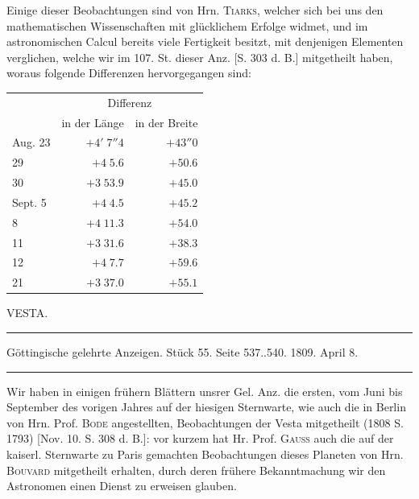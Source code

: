 \par\indent Einige dieser Beobachtungen sind von Hrn. \textsc{Tiarks}, welcher sich bei uns den mathematischen Wissenschaften mit glücklichem Erfolge widmet, und im astronomischen Calcul bereits viele Fertigkeit besitzt, mit denjenigen Elementen verglichen, welche wir im 107. St. dieser Anz. [S. 303 d. B.] mitgetheilt haben, woraus folgende Differenzen hervorgegangen sind:


\begin{center}\fontsize{10}{12}\selectfont\setlength{\tabcolsep}{5pt}\renewcommand{\arraystretch}{1.15}\begin{tabular}{lrr}
 & \multicolumn{2}{c}{Differenz}\\
 & in der Länge & in der Breite\\\hline
Aug. 23 & $+4'\;7''4$ & $+43''0$\\
29 & $+4\;5.6$ & $+50.6$\\
30 & $+3\;53.9$ & $+45.0$\\
Sept. 5 & $+4\;4.5$ & $+45.2$\\
8 & $+4\;11.3$ & $+54.0$\\
11 & $+3\;31.6$ & $+38.3$\\
12 & $+4\;7.7$ & $+59.6$\\
21 & $+3\;37.0$ & $+55.1$\\
\end{tabular}\end{center}


\begin{center}
VESTA.

\par\vspace{4pt}\hrule\vspace{4pt}

\fontsize{9}{11}\selectfont Göttingische gelehrte Anzeigen. Stück 55. Seite 537..540. 1809. April 8.

\par\vspace{4pt}\hrule\vspace{4pt}
\end{center}

Wir haben in einigen frühern Blättern unsrer Gel. Anz. die ersten, vom Juni bis September des vorigen Jahres auf der hiesigen Sternwarte, wie auch die in Berlin von Hrn. Prof. \textsc{Bode} angestellten, Beobachtungen der Vesta mitgetheilt (1808 S. 1793) [Nov. 10. S. 308 d. B.]: vor kurzem hat Hr. Prof. \textsc{Gauss} auch die auf der kaiserl. Sternwarte zu Paris gemachten Beobachtungen dieses Planeten von Hrn.
\textsc{Bouvard} mitgetheilt erhalten, durch deren frühere Bekanntmachung wir den Astronomen einen Dienst zu erweisen glauben.

